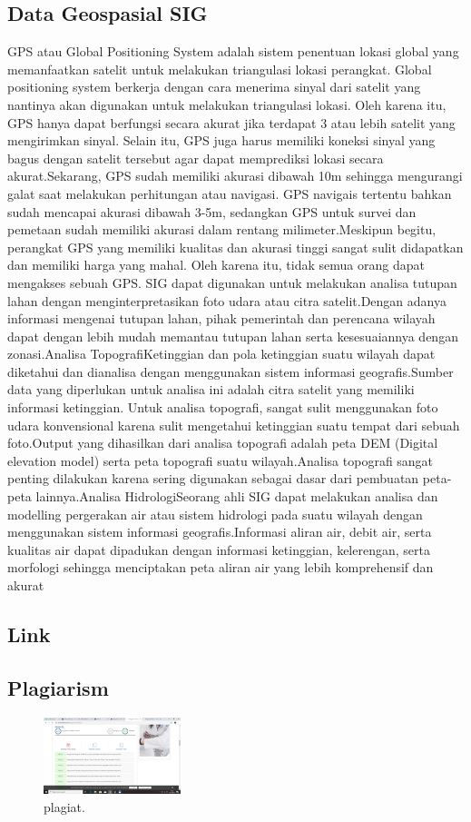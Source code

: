 \subsection{Data Geospasial SIG}
GPS atau Global Positioning System adalah sistem penentuan lokasi global yang memanfaatkan satelit untuk melakukan triangulasi lokasi perangkat.
Global positioning system berkerja dengan cara menerima sinyal dari satelit yang nantinya akan digunakan untuk melakukan triangulasi lokasi. Oleh karena itu, GPS hanya dapat berfungsi secara akurat jika terdapat 3 atau lebih satelit yang mengirimkan sinyal.
Selain itu, GPS juga harus memiliki koneksi sinyal yang bagus dengan satelit tersebut agar dapat memprediksi lokasi secara akurat.Sekarang, GPS sudah memiliki akurasi dibawah 10m sehingga mengurangi galat saat melakukan perhitungan atau navigasi. GPS navigais tertentu bahkan sudah mencapai akurasi dibawah 3-5m, sedangkan GPS untuk survei dan pemetaan sudah memiliki akurasi dalam rentang milimeter.Meskipun begitu, perangkat GPS yang memiliki kualitas dan akurasi tinggi sangat sulit didapatkan dan memiliki harga yang mahal. Oleh karena itu, tidak semua orang dapat mengakses sebuah GPS.
SIG dapat digunakan untuk melakukan analisa tutupan lahan dengan menginterpretasikan foto udara atau citra satelit.Dengan adanya informasi mengenai tutupan lahan, pihak pemerintah dan perencana wilayah dapat dengan lebih mudah memantau tutupan lahan serta kesesuaiannya dengan zonasi.Analisa TopografiKetinggian dan pola ketinggian suatu wilayah dapat diketahui dan dianalisa dengan menggunakan sistem informasi geografis.Sumber data yang diperlukan untuk analisa ini adalah citra satelit yang memiliki informasi ketinggian. Untuk analisa topografi, sangat sulit menggunakan foto udara konvensional karena sulit mengetahui ketinggian suatu tempat dari sebuah foto.Output yang dihasilkan dari analisa topografi adalah peta DEM (Digital elevation model) serta peta topografi suatu wilayah.Analisa topografi sangat penting dilakukan karena sering digunakan sebagai dasar dari pembuatan peta-peta lainnya.Analisa HidrologiSeorang ahli SIG dapat melakukan analisa dan modelling pergerakan air atau sistem hidrologi pada suatu wilayah dengan menggunakan sistem informasi geografis.Informasi aliran air, debit air, serta kualitas air dapat dipadukan dengan informasi ketinggian, kelerengan, serta morfologi sehingga menciptakan peta aliran air yang lebih komprehensif dan akurat

\subsection{Link}
\href{https://youtu.be/T2lvY-cI0IA}{}
\subsection{Plagiarism}
\begin{figure}[H]
	\includegraphics[width=4cm]{figures/1174015/plagiat.png}
	\centering
	\caption{plagiat.}
\end{figure}